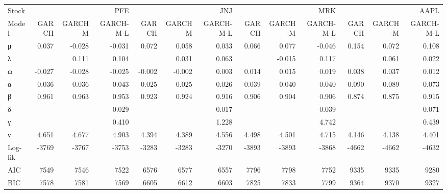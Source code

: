 \begin{tabular}{lrrrrrrrrrrrr}
\toprule
Stock & \multicolumn{3}{r}{PFE} & \multicolumn{3}{r}{JNJ} & \multicolumn{3}{r}{MRK} & \multicolumn{3}{r}{AAPL} \\
Model & GARCH & GARCH-M & GARCH-M-L & GARCH & GARCH-M & GARCH-M-L & GARCH & GARCH-M & GARCH-M-L & GARCH & GARCH-M & GARCH-M-L \\
\midrule
μ & 0.037 & -0.028 & -0.031 & 0.072 & 0.058 & 0.033 & 0.066 & 0.077 & -0.046 & 0.154 & 0.072 & 0.108 \\
λ &  & 0.111 & 0.104 &  & 0.031 & 0.063 &  & -0.015 & 0.117 &  & 0.061 & 0.022 \\
ω & -0.027 & -0.028 & -0.025 & -0.002 & -0.002 & 0.003 & 0.014 & 0.015 & 0.019 & 0.038 & 0.037 & 0.012 \\
α & 0.036 & 0.036 & 0.043 & 0.025 & 0.025 & 0.026 & 0.039 & 0.040 & 0.040 & 0.090 & 0.089 & 0.073 \\
β & 0.961 & 0.963 & 0.953 & 0.923 & 0.924 & 0.916 & 0.906 & 0.904 & 0.906 & 0.874 & 0.875 & 0.915 \\
δ &  &  & 0.029 &  &  & 0.017 &  &  & 0.039 &  &  & 0.071 \\
γ &  &  & 0.410 &  &  & 1.228 &  &  & 4.742 &  &  & 0.439 \\
ν & 4.651 & 4.677 & 4.903 & 4.394 & 4.389 & 4.556 & 4.498 & 4.501 & 4.715 & 4.146 & 4.138 & 4.401 \\
Log-lik & -3769 & -3767 & -3753 & -3283 & -3283 & -3270 & -3893 & -3893 & -3868 & -4662 & -4662 & -4632 \\
AIC & 7549 & 7546 & 7522 & 6576 & 6577 & 6557 & 7796 & 7798 & 7752 & 9335 & 9335 & 9280 \\
BIC & 7578 & 7581 & 7569 & 6605 & 6612 & 6603 & 7825 & 7833 & 7799 & 9364 & 9370 & 9327 \\
\bottomrule
\end{tabular}
